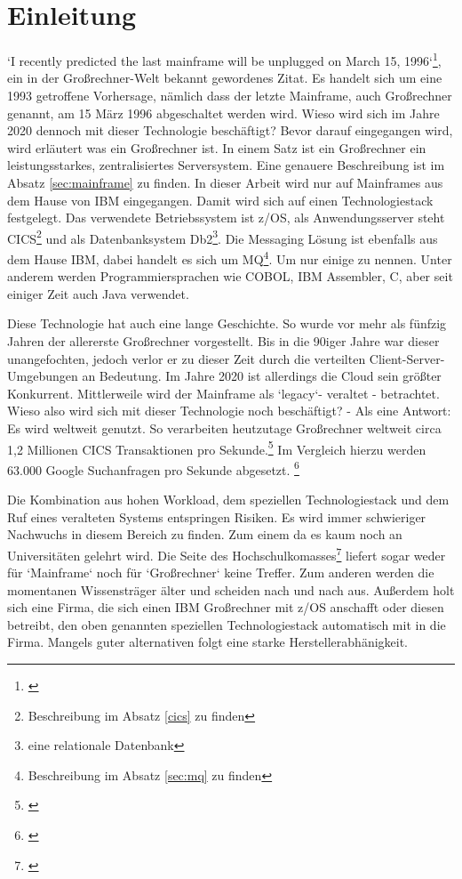 \chapter{Einleitung}\label{ch:einleitung}
`I recently predicted the last mainframe will be unplugged on March 15, 1996`\footnote{\cite{Alsop.1993}}, ein in der Großrechner-Welt bekannt gewordenes Zitat.
Es handelt sich um eine 1993 getroffene Vorhersage, nämlich dass der letzte Mainframe, auch Großrechner genannt, am 15 März 1996 abgeschaltet werden wird.
Wieso wird sich im Jahre 2020 dennoch mit dieser Technologie beschäftigt?
Bevor darauf eingegangen wird, wird erläutert was ein Großrechner ist.
In einem Satz ist ein Großrechner ein leistungsstarkes, zentralisiertes Serversystem.
Eine genauere Beschreibung ist im Absatz \ref{sec:mainframe} zu finden.
In dieser Arbeit wird nur auf Mainframes aus dem Hause von IBM eingegangen.
Damit wird sich auf einen Technologiestack festgelegt.
Das verwendete Betriebssystem ist z/OS, als Anwendungsserver steht CICS\footnote{Beschreibung im Absatz \ref{cics} zu finden} und als Datenbanksystem Db2\footnote{eine relationale Datenbank}.
Die Messaging Lösung ist ebenfalls aus dem Hause IBM, dabei handelt es sich um MQ\footnote{Beschreibung im Absatz \ref{sec:mq} zu finden}.
Um nur einige zu nennen.
Unter anderem werden Programmiersprachen wie COBOL, IBM Assembler, C, aber seit einiger Zeit auch Java verwendet.

Diese Technologie hat auch eine lange Geschichte.
So wurde vor mehr als fünfzig Jahren der allererste Großrechner vorgestellt.
Bis in die 90iger Jahre war dieser unangefochten, jedoch verlor er zu dieser Zeit durch die verteilten Client-Server-Umgebungen an Bedeutung.
Im Jahre 2020 ist allerdings die Cloud sein größter Konkurrent.
Mittlerweile wird der Mainframe als `legacy`- veraltet - betrachtet.
Wieso also wird sich mit dieser Technologie noch beschäftigt? - Als eine Antwort: Es wird weltweit genutzt.
So verarbeiten heutzutage Großrechner weltweit circa 1,2 Millionen CICS Transaktionen pro Sekunde.\footnote{\cite{IBM.2019}}
Im Vergleich hierzu werden 63.000 Google Suchanfragen pro Sekunde abgesetzt. \footnote{\cite{Sullivan.2016}}

Die Kombination aus hohen Workload, dem speziellen Technologiestack und dem Ruf eines veralteten Systems entspringen Risiken.
Es wird immer schwieriger Nachwuchs in diesem Bereich zu finden.
Zum einem da es kaum noch an Universitäten gelehrt wird.
Die Seite des Hochschulkomasses\footnote{\cite{internetagenturKolnFrankfurtsunzinetTYPO3Programmmierung.}} liefert sogar weder für `Mainframe` noch für `Großrechner` keine Treffer.
Zum anderen werden die momentanen Wissensträger älter und scheiden nach und nach aus.
Außerdem holt sich eine Firma, die sich einen IBM Großrechner mit z/OS anschafft oder diesen betreibt, den oben genannten speziellen Technologiestack automatisch mit in die Firma.
Mangels guter alternativen folgt eine starke Herstellerabhänigkeit.

